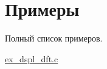 \section{Примеры}
Полный список примеров.\begin{DoxyCompactItemize}
\item 
\hyperlink{ex_dspl_dft_8c-example}{ex\+\_\+dspl\+\_\+dft.\+c}
\end{DoxyCompactItemize}
